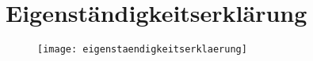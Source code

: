 \newpage
\section{Eigenständigkeitserklärung}




\begin{figure}[H]
    \centering
    \begin{adjustbox}{width=\linewidth, center}
        \texttt{[image: eigenstaendigkeitserklaerung]}
    \end{adjustbox}
\end{figure}

